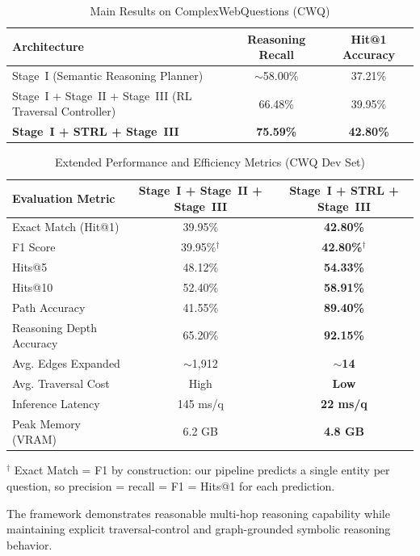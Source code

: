 \documentclass[10pt,conference]{IEEEtran}
\begin{document}
\begin{table}[t]
\centering
\caption{Main Results on ComplexWebQuestions (CWQ)}
\label{tab:main_results}
\begin{tabular}{lcc}
\toprule
\textbf{Architecture} & \textbf{Reasoning Recall} & \textbf{Hit@1 Accuracy} \\
\midrule
Stage~I (Semantic Reasoning Planner) & $\sim$58.00\% & 37.21\% \\
Stage~I + Stage~II + Stage~III (RL Traversal Controller) & 66.48\% & 39.95\% \\
\textbf{Stage~I + STRL + Stage~III} & \textbf{75.59\%} & \textbf{42.80\%} \\
\bottomrule
\end{tabular}
\end{table}

\begin{table}[t]
\centering
\caption{Extended Performance and Efficiency Metrics (CWQ Dev Set)}
\label{tab:extended_metrics}
\begin{tabular}{lcc}
\toprule
\textbf{Evaluation Metric} & \textbf{Stage~I + Stage~II + Stage~III} & \textbf{Stage~I + STRL + Stage~III} \\
\midrule
Exact Match (Hit@1) & 39.95\% & \textbf{42.80\%} \\
F1 Score & 39.95\%$^\dagger$ & \textbf{42.80\%}$^\dagger$ \\
Hits@5 & 48.12\% & \textbf{54.33\%} \\
Hits@10 & 52.40\% & \textbf{58.91\%} \\
Path Accuracy & 41.55\% & \textbf{89.40\%} \\
Reasoning Depth Accuracy & 65.20\% & \textbf{92.15\%} \\
\midrule
Avg. Edges Expanded & $\sim$1,912 & \textbf{$\sim$14} \\
Avg. Traversal Cost & High & \textbf{Low} \\
Inference Latency & 145 ms/q & \textbf{22 ms/q} \\
Peak Memory (VRAM) & 6.2 GB & \textbf{4.8 GB} \\
\bottomrule
\end{tabular}
{\footnotesize $^\dagger$ Exact Match = F1 by construction: our pipeline predicts a single entity per question, so precision = recall = F1 = Hits@1 for each prediction.}
\end{table}

The framework demonstrates reasonable multi-hop reasoning capability while maintaining explicit traversal-control and graph-grounded symbolic reasoning behavior.
\end{document}
